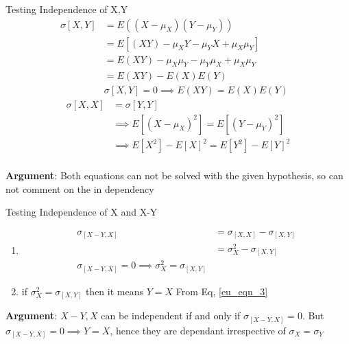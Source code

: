 \documentclass[10pt]{beamer}
\begin{document}
\begin{frame}{Testing Independence of X,Y}
 \begin{align*}
        \sigma{[X,Y]} &= E((X-\mu_X) (Y-\mu_Y))\\
        &= E[(XY) - \mu_XY - \mu_YX + \mu_X\mu_Y] \\
        &= E(XY) -\mu_X\mu_Y - \mu_Y\mu_X + \mu_X\mu_Y\\
        &= E(XY) - E(X)E(Y) &\\
        &\sigma{[X,Y]} = 0 \implies E(XY)  = E(X)E(Y)
 \end{align*}
  \begin{align*}
        \sigma{[X,X]} &=\sigma{[Y,Y]}\\
        &\implies E[(X-\mu_X)^2] =  E[(Y-\mu_Y)^2] \\
        &\implies E[X^2] - E[X]^2 = E[Y^2] - E[Y]^2\\
 \end{align*}
\begin{tcolorbox}
\large \textbf{Argument}: \small Both equations can not be solved with the given hypothesis, so can not comment on the in dependency
\end{tcolorbox}
\end{frame}

\begin{frame}{Testing Independence of X and X-Y }
\begin{enumerate}
\item \begin{align*}
    \sigma_{[X-Y,X]} &= \sigma_{[X,X]} - \sigma_{[X,Y]}\\
                     &= \sigma_{X}^2 - \sigma_{[X,Y]}\\
    \sigma_{[X-Y,X]} = 0 \implies \sigma_{X}^2 = \sigma_{[X,Y]}
\end{align*}
\item if $\sigma_{X}^2 = \sigma_{[X,Y]}$ then it means $Y=X$ From Eq, \ref{eu_eqn_3}\\
\end{enumerate}
\begin{tcolorbox}
\large \textbf{Argument}: \small $X-Y, X$ can be independent if and only if  $\sigma_{[X-Y,X]} = 0$. But $\sigma_{[X-Y,X]} = 0 \implies Y=X$, hence they are dependant irrespective of $\sigma_X = \sigma_Y$
\end{tcolorbox}
\end{frame}
\end{document}
